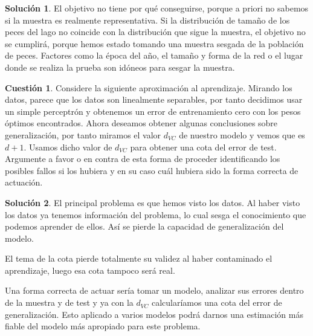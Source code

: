 \documentclass[a4paper, 11pt]{article}
\theoremstyle{definition}
\newtheorem{cuestion}{Cuestión}
\newtheorem*{solucion}{Solución}
\begin{document}
  \begin{solucion}
    El objetivo no tiene por qué conseguirse, porque a priori no sabemos si la muestra es realmente representativa. Si la distribución de tamaño de los peces del lago no coincide con la distribución que sigue la muestra, el objetivo no se cumplirá, porque hemos estado tomando una muestra sesgada de la población de peces. Factores como la época del año, el tamaño y forma de la red o el lugar donde se realiza la prueba son idóneos para sesgar la muestra.
  \end{solucion}

  \begin{cuestion}
    Considere la siguiente aproximación al aprendizaje. Mirando los datos, parece que los datos son linealmente separables, por tanto decidimos usar un simple perceptrón y obtenemos un error de entrenamiento cero con los pesos óptimos encontrados. Ahora deseamos obtener algunas conclusiones sobre generalización, por tanto miramos el valor $d_{VC}$ de nuestro modelo y vemos que es $d+1$. Usamos dicho valor de $d_{VC}$ para obtener una cota del error de test. Argumente a favor o en contra de esta forma de proceder identificando los posibles fallos si los hubiera y en su caso cuál hubiera sido la forma correcta de actuación.
  \end{cuestion}

  \begin{solucion}
    El principal problema es que hemos visto los datos. Al haber visto los datos ya tenemos información del problema, lo cual sesga el conocimiento que podemos aprender de ellos. Así se pierde la capacidad de generalización del modelo.

    El tema de la cota pierde totalmente su validez al haber contaminado el aprendizaje, luego esa cota tampoco será real.

    Una forma correcta de actuar sería tomar un modelo, analizar sus errores dentro de la muestra y de test y ya con la $d_{VC}$ calcularíamos una cota del error de generalización. Esto aplicado a varios modelos podrá darnos una estimación más fiable del modelo más apropiado para este problema.
  \end{solucion}
\end{document}
